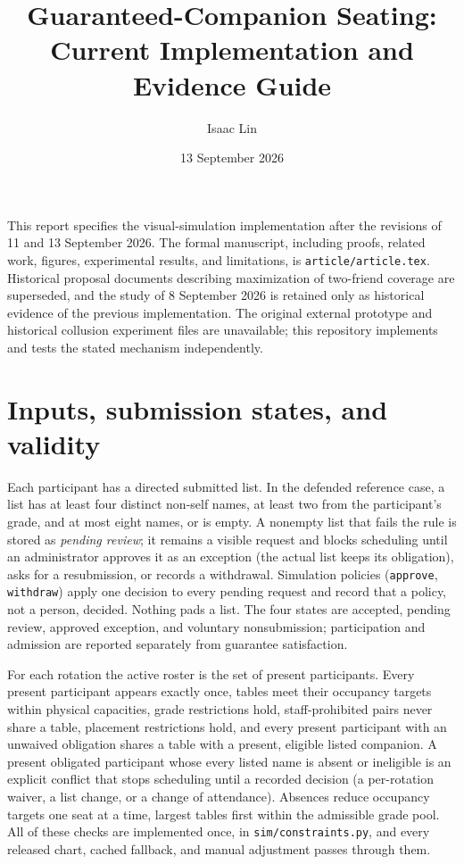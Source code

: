 \documentclass[11pt,a4paper]{article}
\title{Guaranteed-Companion Seating:\\Current Implementation and Evidence Guide}
\author{Isaac Lin}
\date{13 September 2026}
\begin{document}
\maketitle
This report specifies the visual-simulation implementation after the revisions of 11 and 13 September 2026. The formal manuscript, including proofs, related work, figures, experimental results, and limitations, is \texttt{article/article.tex}. Historical proposal documents describing maximization of two-friend coverage are superseded, and the study of 8 September 2026 is retained only as historical evidence of the previous implementation. The original external prototype and historical collusion experiment files are unavailable; this repository implements and tests the stated mechanism independently.

\section{Inputs, submission states, and validity}
Each participant has a directed submitted list. In the defended reference case, a list has at least four distinct non-self names, at least two from the participant's grade, and at most eight names, or is empty. A nonempty list that fails the rule is stored as \emph{pending review}; it remains a visible request and blocks scheduling until an administrator approves it as an exception (the actual list keeps its obligation), asks for a resubmission, or records a withdrawal. Simulation policies (\texttt{approve}, \texttt{withdraw}) apply one decision to every pending request and record that a policy, not a person, decided. Nothing pads a list. The four states are accepted, pending review, approved exception, and voluntary nonsubmission; participation and admission are reported separately from guarantee satisfaction.

For each rotation the active roster is the set of present participants. Every present participant appears exactly once, tables meet their occupancy targets within physical capacities, grade restrictions hold, staff-prohibited pairs never share a table, placement restrictions hold, and every present participant with an unwaived obligation shares a table with a present, eligible listed companion. A present obligated participant whose every listed name is absent or ineligible is an explicit conflict that stops scheduling until a recorded decision (a per-rotation waiver, a list change, or a change of attendance). Absences reduce occupancy targets one seat at a time, largest tables first within the admissible grade pool. All of these checks are implemented once, in \texttt{sim/constraints.py}, and every released chart, cached fallback, and manual adjustment passes through them.

\end{document}
